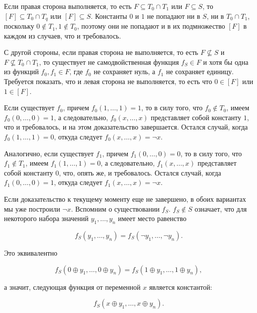 		Если правая сторона выполняется, то есть $F \subseteq T_0 \cap T_1$ или $F \subseteq S$, то $[F] \subseteq T_0 \cap T_q$ или $[F] \subseteq S$. Константы $0$ и $1$ не попадают ни в $S$, ни в $T_0 \cap T_1$, поскольку $0 \not\in T_1, 1 \not\in T_0$, поэтому они не попадают и в их подмножество $[F]$ в каждом из случаев, что и требовалось.

		С другой стороны, если правая сторона не выполняется, то есть $F \not\subseteq S$ и $F \not\subseteq T_0 \cap T_1$, то существует не самодвойственная функция $f_S \in F$ и хотя бы одна из функций $f_0, f_1 \in F$, где $f_0$ не сохраняет нуль, а $f_1$ не сохраняет единицу. Требуется показать, что и левая сторона не выполняется, то есть что $0 \in [F]$ или $1 \in [F]$.

		Если существует $f_0$, причем $f_0(1, \dots, 1) = 1$, то в силу того, что $f_0 \not\in T_0$, имеем $f_0(0, \dots, 0) = 1$, а следовательно, $f_0(x, \dots, x)$ представляет собой константу $1$, что и требовалось, и на этом доказательство завершается. Остался случай, когда $f_0(1, \dots, 1) = 0$, откуда следует $f_0(x, \dots, x) = \neg x$.

		Аналогично, если существует $f_1$, причем $f_1(0, \dots, 0) = 0$, то в силу того, что $f_1 \not\in T_1$, имеем $f_1(1, \dots, 1) = 0$, а следовательно, $f_1(x, \dots, x)$ представляет собой константу $0$, что, опять же, и требовалось. Остался случай, когда $f_1(0, \dots, 0) = 1$, откуда следует $f_1(x, \dots, x) = \neg x$.

		Если доказательство к текущему моменту еще не завершено, в обоих вариантах мы уже построили $\neg x$. Вспомним о существовании $f_S$. $f_S \not\in S$ означает, что для некоторого набора значений $y_1, \dots, y_n$ имеет место равенство

		\begin{equation*}
			f_S(y_1, \dots, y_n) = f_S(\neg y_1, \dots, \neg y_n).
		\end{equation*}

		Это эквивалентно

		\begin{equation*}
			f_S(0 \oplus y_1, \dots, 0 \oplus y_n) = f_S(1 \oplus y_1, \dots, 1 \oplus y_n),
		\end{equation*}

		а значит, следующая функция от переменной $x$ является константой:

		\begin{equation*}
			f_S(x \oplus y_1, \dots, x \oplus y_n).
		\end{equation*}


